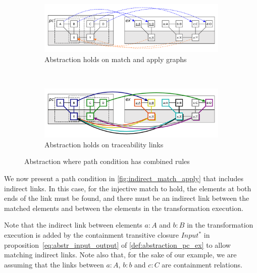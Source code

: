 \begin{figure}[htb]
        \centering
        \begin{subfigure}[b]{0.70\textwidth}
                \centering
                \includegraphics[width=1\textwidth]{./figures/abstraction_relation/combination.pdf}
               	\caption{Abstraction holds on match and apply graphs}
               	\label{fig:combination_match_apply}
        \end{subfigure}%
        ~~\\
        \begin{subfigure}[b]{0.70\textwidth}
                \centering
                \includegraphics[width=1\textwidth]{./figures/abstraction_relation/combination_trace_links.pdf}
                \caption{Abstraction holds on traceability links}
                \label{fig:combination_trace_links}
        \end{subfigure}%
        \caption{Abstraction where path condition has combined rules}
        \label{fig:combination}
\end{figure}

We now present a path condition  in \cref{fig:indirect_match_apply} that includes indirect links. In this case, for the injective match to hold, the elements at both ends of the link must be found, and there must be an indirect link between the matched elements and between the elements in the transformation execution.

Note that the indirect link between elements $a:A$ and $b:B$ in the transformation execution is added by the containment transitive closure $Input^{*}$ in proposition~\ref{eq:abstr_input_output} of \cref{def:abstraction_pc_ex} to allow matching indirect links. Note also that, for the sake of our example, we are assuming that the links between $a:A$, $b:b$ and $c:C$ are containment relations.

